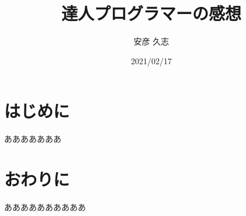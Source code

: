 \documentclass[a4paper,platex,dvipdfmx]{jarticle}
\title{達人プログラマーの感想}
\date{2021/02/17}
\author{安彦 久志}
\begin{document}
\maketitle
\section{はじめに}
あああああああ
\section{おわりに}
ああああああああああ
\end{document}
